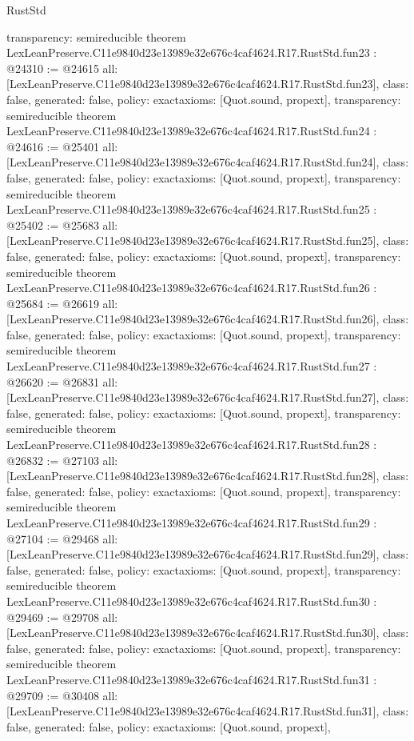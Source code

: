 \begin{lexlean}{RustStd}
\begin{coremodule}
{  transparency: semireducible
}
theorem LexLeanPreserve.C11e9840d23e13989e32e676c4caf4624.R17.RustStd.fun23 : @24310 := @24615 {
  all: [LexLeanPreserve.C11e9840d23e13989e32e676c4caf4624.R17.RustStd.fun23],
  class: false,
  generated: false,
  policy: exact{axioms: [Quot.sound, propext]},
  transparency: semireducible
}
theorem LexLeanPreserve.C11e9840d23e13989e32e676c4caf4624.R17.RustStd.fun24 : @24616 := @25401 {
  all: [LexLeanPreserve.C11e9840d23e13989e32e676c4caf4624.R17.RustStd.fun24],
  class: false,
  generated: false,
  policy: exact{axioms: [Quot.sound, propext]},
  transparency: semireducible
}
theorem LexLeanPreserve.C11e9840d23e13989e32e676c4caf4624.R17.RustStd.fun25 : @25402 := @25683 {
  all: [LexLeanPreserve.C11e9840d23e13989e32e676c4caf4624.R17.RustStd.fun25],
  class: false,
  generated: false,
  policy: exact{axioms: [Quot.sound, propext]},
  transparency: semireducible
}
theorem LexLeanPreserve.C11e9840d23e13989e32e676c4caf4624.R17.RustStd.fun26 : @25684 := @26619 {
  all: [LexLeanPreserve.C11e9840d23e13989e32e676c4caf4624.R17.RustStd.fun26],
  class: false,
  generated: false,
  policy: exact{axioms: [Quot.sound, propext]},
  transparency: semireducible
}
theorem LexLeanPreserve.C11e9840d23e13989e32e676c4caf4624.R17.RustStd.fun27 : @26620 := @26831 {
  all: [LexLeanPreserve.C11e9840d23e13989e32e676c4caf4624.R17.RustStd.fun27],
  class: false,
  generated: false,
  policy: exact{axioms: [Quot.sound, propext]},
  transparency: semireducible
}
theorem LexLeanPreserve.C11e9840d23e13989e32e676c4caf4624.R17.RustStd.fun28 : @26832 := @27103 {
  all: [LexLeanPreserve.C11e9840d23e13989e32e676c4caf4624.R17.RustStd.fun28],
  class: false,
  generated: false,
  policy: exact{axioms: [Quot.sound, propext]},
  transparency: semireducible
}
theorem LexLeanPreserve.C11e9840d23e13989e32e676c4caf4624.R17.RustStd.fun29 : @27104 := @29468 {
  all: [LexLeanPreserve.C11e9840d23e13989e32e676c4caf4624.R17.RustStd.fun29],
  class: false,
  generated: false,
  policy: exact{axioms: [Quot.sound, propext]},
  transparency: semireducible
}
theorem LexLeanPreserve.C11e9840d23e13989e32e676c4caf4624.R17.RustStd.fun30 : @29469 := @29708 {
  all: [LexLeanPreserve.C11e9840d23e13989e32e676c4caf4624.R17.RustStd.fun30],
  class: false,
  generated: false,
  policy: exact{axioms: [Quot.sound, propext]},
  transparency: semireducible
}
theorem LexLeanPreserve.C11e9840d23e13989e32e676c4caf4624.R17.RustStd.fun31 : @29709 := @30408 {
  all: [LexLeanPreserve.C11e9840d23e13989e32e676c4caf4624.R17.RustStd.fun31],
  class: false,
  generated: false,
  policy: exact{axioms: [Quot.sound, propext]},
}
\end{coremodule}
\end{lexlean}
